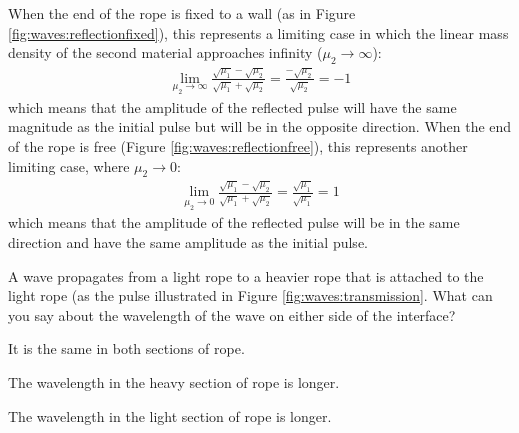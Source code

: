 When the end of the rope is fixed to a wall (as in Figure \ref{fig:waves:reflectionfixed}), this represents a limiting case in which the linear mass density of the second material approaches infinity ($\mu_2 \rightarrow \infty$):
\begin{align*}
\lim_{\mu_2\to \infty}\frac{\sqrt{\mu_1}-\sqrt{\mu_2}}{\sqrt{\mu_1}+\sqrt{\mu_2}}=\frac{-\sqrt{\mu_2}}{\sqrt{\mu_2}}=-1
\end{align*}
which means that the amplitude of the reflected pulse will have the same magnitude as the initial pulse but will be in the opposite direction. When the end of the rope is free (Figure \ref{fig:waves:reflectionfree}), this represents another limiting case, where $\mu_2\rightarrow 0$:
\begin{align*}
\lim_{\mu_2\to 0}\frac{\sqrt{\mu_1}-\sqrt{\mu_2}}{\sqrt{\mu_1}+\sqrt{\mu_2}}=\frac{\sqrt{\mu_1}}{\sqrt{\mu_1}}=1
\end{align*}
which means that the amplitude of the reflected pulse will be in the same direction  and have the same amplitude as the initial pulse. 


\begin{checkpoint}
\begin{MCquestion}{A wave propagates from a light rope to a heavier rope that is attached to the light rope (as the pulse illustrated in Figure \ref{fig:waves:transmission}. What can you say about the wavelength of the wave on either side of the interface?}
\item It is the same in both sections of rope.
\item The wavelength in the heavy section of rope is longer.
\item The wavelength in the light section of rope is longer.\correct
\end{MCquestion}
\end{checkpoint}

